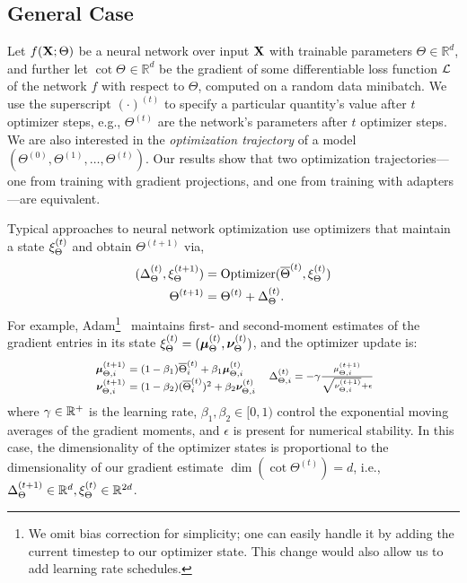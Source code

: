 \vcram{-1mm}
\subsection{General Case}
\vcram{-1mm}
Let $f({\mathbf{X}}; \Theta)$ be a neural network over input ${\mathbf{X}}$ with trainable parameters $\Theta \in \mathbb{R}^{d}$, and further let $\cot \Theta^{} \in \mathbb{R}^{d}$ be the gradient of some differentiable loss function ${\mathcal{L}}$ of the network $f$ with respect to $\Theta$, computed on a random data minibatch.
We use the superscript $\left(\cdot\right)^{(t)}$ to specify a particular quantity's value after $t$ optimizer steps, e.g.,  $\Theta^{(t)}$ are the network's parameters after $t$ optimizer steps.
We are also interested in the \textit{optimization trajectory} of a model   $(\Theta^{(0)}, \Theta^{(1)}, \ldots, \Theta^{(t)})$.
Our  results show that two optimization trajectories---one from training with gradient projections, and one from training with adapters---are equivalent.

Typical approaches to neural network optimization use optimizers that maintain a state $\xi_{\Theta}^{(t)}$ and obtain $\Theta^{(t+1)}$ via,
\setlength{\abovedisplayskip}{4pt}
\setlength{\belowdisplayskip}{4pt}
\begin{align}
   (\Delta_{\Theta}^{(t)}, \xi_{\Theta}^{(t + 1)}) &= \operatorname{Optimizer}( \overline{\Theta}^{(t)}, \xi_{\Theta}^{(t)}) \\
   \Theta^{(t+1)} &= \Theta^{(t)} + \Delta_{\Theta}^{(t)}.
    \label{eq:optim-definition}
\end{align}
For example, Adam\footnote{We omit bias correction for simplicity; one can easily handle it by adding the current timestep to our optimizer state. This change would also allow us to add learning rate schedules.}~\citep{adam} maintains first- and second-moment estimates of the gradient entries in its state $\xi_{\Theta}^{(t)} = ({\boldsymbol{\mu}}_\Theta^{(t)}, {\boldsymbol{\nu}}_\Theta^{(t)})$, and the optimizer update is:
\setlength{\abovedisplayskip}{\baselineskip}
\setlength{\belowdisplayskip}{\baselineskip}
\[
\begin{array}{r@{\;}l}
    \text{\footnotesize \( \vmu_{\Theta, i}^{(t + 1)} \)}&\text{\footnotesize \(= (1 - \beta_1) \cot{\Theta}_i^{(t)} + \beta_1 \vmu_{\Theta, i}^{(t)} \) }\\[1pt]
    \text{\footnotesize \( \vnu_{\Theta, i}^{(t + 1)} \)}& \text{\footnotesize \(= (1 - \beta_2) (\cot{\Theta}_i^{(t)})^2 + \beta_2 \vnu_{\Theta, i}^{(t)} \) }
\end{array}
\;
\vcenter{\hbox{\( \text{\footnotesize \( \update{\Theta, i}{t} = - \gamma \frac{\mu_{\Theta, i}^{(t + 1)}}{\sqrt{\nu_{\Theta, i}^{(t + 1)}} + \epsilon} \) } \)}}
\]
where $\gamma \in \mathbb{R}^+$ is the learning rate, $\beta_1, \beta_2 \in [0, 1)$ control the exponential moving averages of the gradient moments, and $\epsilon$ is present for numerical stability.
In this case, the dimensionality of the optimizer states is proportional to the dimensionality of our gradient estimate $\dim(\cot{\Theta}^{(t)}) = d$, i.e., 
$\Delta_{\Theta}^{(t + 1)} \in \mathbb{R}^{d}, \xi_{\Theta}^{(t)} \in \mathbb{R}^{2d}$.

